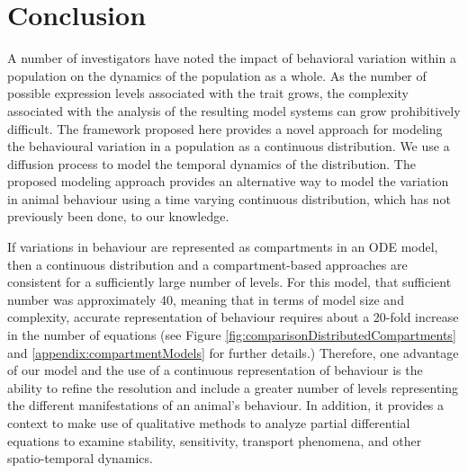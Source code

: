 \documentclass[review,authoryear]{elsarticle}
\newcommand{\origM}{m}
\begin{document}
\section{Conclusion}




 A number of investigators have noted the impact of behavioral variation within a population on the dynamics of the population as a whole. As the number of possible expression levels associated with the trait grows,  the complexity associated with the analysis of the resulting model systems can grow prohibitively difficult. The framework proposed here provides a novel approach for modeling the behavioural variation in a population as a continuous distribution. We use a diffusion process to model the temporal dynamics of the distribution. The proposed modeling approach provides an alternative way to model the variation in animal behaviour using a time varying continuous distribution, which has not previously been done, to our knowledge. 
 
If variations in behaviour are represented as compartments in an ODE model, then a continuous distribution and a compartment-based approaches are consistent for a sufficiently large number of levels. For this model, that sufficient number was approximately 40, meaning that in terms of model size and complexity, accurate representation of behaviour requires about a 20-fold increase in the number of equations (see Figure \ref{fig:comparisonDistributedCompartments} and  \ref{appendix:compartmentModels} for further details.) Therefore, one advantage of our model and the use of a continuous representation of behaviour is the ability to refine the resolution and include a greater number of levels representing the different manifestations of an animal's behaviour. In addition,  it provides a context to make use of qualitative methods to analyze partial differential equations to examine stability, sensitivity, transport phenomena, and other spatio-temporal dynamics.
 
\end{document}
